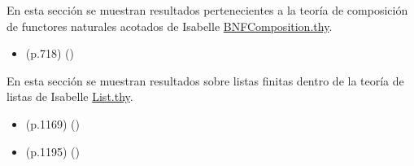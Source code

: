 \begin{isabellebody}
\begin{isamarkuptext}
En esta sección se muestran resultados pertenecientes a la
  teoría de composición de functores naturales acotados de Isabelle 
  \href{https://bit.ly/2zGl9v6}{BNFComposition.thy}.%
\end{isamarkuptext}\isamarkuptrue%
%
\begin{isamarkuptext}%
\begin{itemize}
    \item (p.718)  
      \hfill ()
  \end{itemize}%
\end{isamarkuptext}\isamarkuptrue%
%
\isadelimdocument
%
\endisadelimdocument
%
\isatagdocument
%
\isamarkuptrue%
%
\endisatagdocument
{\isafolddocument}%
%
\isadelimdocument
%
\endisadelimdocument
%
\begin{isamarkuptext}%
En esta sección se muestran resultados sobre listas finitas 
  dentro de la teoría de listas de Isabelle 
  \href{https://bit.ly/3bCNxvX}{List.thy}.%
\end{isamarkuptext}\isamarkuptrue%
%
\begin{isamarkuptext}%
\begin{itemize}
    \item (p.1169)  
      \hfill ()
  \end{itemize}%
\end{isamarkuptext}\isamarkuptrue%
%
\isadelimdocument
%
\endisadelimdocument
%
\isatagdocument
%
\isamarkuptrue%
%
\isamarkuptrue%
%
\endisatagdocument
{\isafolddocument}%
%
\isadelimdocument
%
\endisadelimdocument
%
\begin{isamarkuptext}%
\begin{itemize}
    \item (p.1195)  
      \hfill ()
  \end{itemize}%
\end{isamarkuptext}\isamarkuptrue%
%
\isadelimtheory
%
\endisadelimtheory
%
\isatagtheory
%
\endisatagtheory
{\isafoldtheory}%
%
\isadelimtheory
%
\endisadelimtheory
%
\end{isabellebody}%
